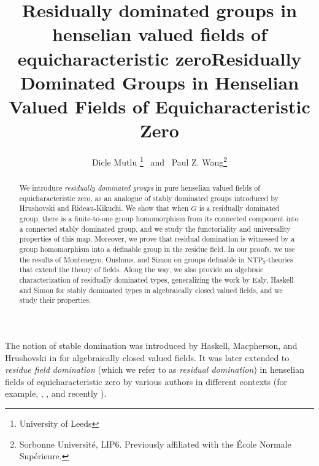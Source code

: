 \documentclass[12pt]{article}
\title{Residually dominated groups in henselian valued fields of equicharacteristic zero}
\title{Residually Dominated Groups in Henselian Valued Fields of Equicharacteristic Zero}
\author{Dicle Mutlu \thanks{University of Leeds}
\ and \ Paul Z. Wang\thanks{Sorbonne Université, LIP6. Previously affiliated with the École Normale Supérieure.}
}
\date{} %
\newcommand{\NTP}{\mathrm{NTP_2}}
\newcommand{\0}{\emptyset}
\theoremstyle{plain}%
\theoremstyle{definition}
\theoremstyle{remark}
\begin{document}
\maketitle
\begin{abstract} We introduce \emph{residually dominated groups} in pure henselian valued fields of equicharacteristic zero, as an analogue of stably dominated groups introduced by Hrushovski and Rideau-Kikuchi. We show that when $G$ is a residually dominated group, there is a finite-to-one group homomorphism from its connected component into a connected stably dominated group, and we study the functoriality and universality properties of this map. Moreover, we prove that residual domination is witnessed by a group homomorphism into a definable group in the residue field. In our proofs, we use the results of Montenegro, Onshuus, and Simon on groups definable in $\mathrm{NTP}_2$-theories that extend the theory of fields. Along the way, we also provide an algebraic characterization of residually dominated types, generalizing the work by Ealy, Haskell and Simon for stably dominated types in algebraically closed valued fields, and we study their properties. 




\end{abstract}



The notion of stable domination was introduced by Haskell, Macpherson, and Hrushovski in \cite{HHM08} for algebraically closed valued fields. It was later extended to \textit{residue field domination} (which we refer to as \emph{residual domination}) in henselian fields of equicharacteristic zero by various authors in different contexts (for example, \cite{EHM19}, \cite{EHS23}, \cite{Vic22} and recently \cite{KRV24}). 
\end{document}
